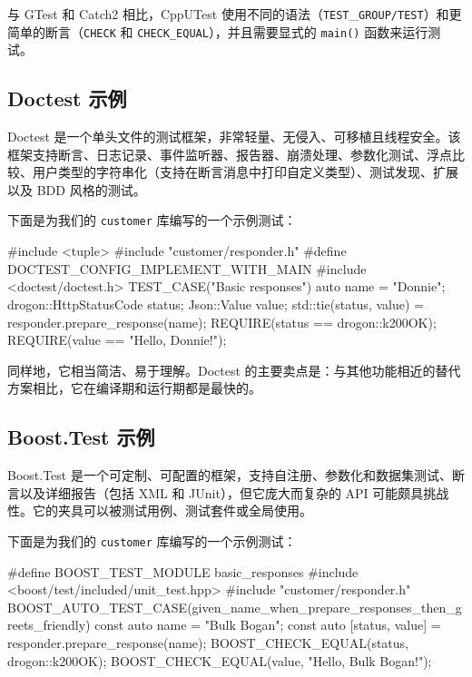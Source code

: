 与 GTest 和 Catch2 相比，CppUTest 使用不同的语法（\texttt{TEST}\_\texttt{GROUP/\allowbreak{}TEST}）和更简单的断言（\texttt{CHECK} 和 \texttt{CHECK\_\allowbreak{}EQUAL}），并且需要显式的 \texttt{main()} 函数来运行测试。

\subsection{Doctest 示例}

\label{idx:826}
\label{idx:827}
Doctest 是一个单头文件的测试框架，非常轻量、无侵入、可移植且线程安全。该框架支持断言、日志记录、事件监听器、报告器、崩溃处理、参数化测试、浮点比较、用户类型的字符串化（支持在断言消息中打印自定义类型）、测试发现、扩展以及 BDD 风格的测试。

下面是为我们的 \texttt{customer} 库编写的一个示例测试：

\begin{codebox}[cpp]
#include <tuple>
#include "customer/responder.h"
#define DOCTEST_CONFIG_IMPLEMENT_WITH_MAIN
#include <doctest/doctest.h>
TEST_CASE("Basic responses") {
  auto name = "Donnie";
  drogon::HttpStatusCode status;
  Json::Value value;
  std::tie(status, value) = responder{}.prepare_response(name);
  REQUIRE(status == drogon::k200OK);
  REQUIRE(value == "Hello, Donnie!");
}
\end{codebox}

\label{idx:828}
\label{idx:829}
同样地，它相当简洁、易于理解。Doctest 的主要卖点是：与其他功能相近的替代方案相比，它在编译期和运行期都是最快的。

\subsection{Boost.Test 示例}

\label{idx:830}
\label{idx:831}
Boost.Test 是一个可定制、可配置的框架，支持自注册、参数化和数据集测试、断言以及详细报告（包括 XML 和 JUnit），但它庞大而复杂的 API 可能颇具挑战性。它的夹具可以被测试用例、测试套件或全局使用。

下面是为我们的 \texttt{customer} 库编写的一个示例测试：

\begin{codebox}[cpp]
#define BOOST_TEST_MODULE basic_responses
#include <boost/test/included/unit_test.hpp>
#include "customer/responder.h"
BOOST_AUTO_TEST_CASE(given_name_when_prepare_responses_then_greets_friendly) {
  const auto name = "Bulk Bogan";
  const auto [status, value] = responder{}.prepare_response(name);
  BOOST_CHECK_EQUAL(status, drogon::k200OK);
  BOOST_CHECK_EQUAL(value, "Hello, Bulk Bogan!");
}
\end{codebox}

